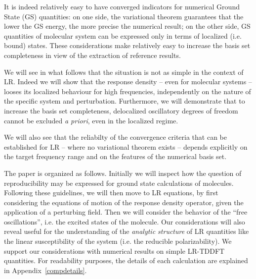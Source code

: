 \documentclass[reprint,aps,prb]{revtex4-1}
\begin{document}
It is indeed relatively easy to have converged indicators for numerical Ground State (GS) quantities: on one side, the variational theorem
guarantees that the lower the GS energy, the more precise the numerical result; on the other side, GS quantities of molecular system  can be expressed
only in terms of localized (i.e. bound) states. These considerations make relatively easy to increase the basis set completeness in view of the extraction of reference results.

We will see in what follows that the situation is not as simple in the context of LR. Indeed we will show that the response density -- even for molecular systems -- looses its localized behaviour for high frequencies, independently on the nature of the specific system and perturbation. Furthermore, we will demonstrate that to increase the basis set completeness, delocalized oscillatory degrees of freedom cannot be excluded \textit{a priori}, even in the localized regime.

We will also see that the reliabilty of the convergence criteria that can be established for LR -- where no variational theorem exists -- depends explicitly on the target frequency range and on the features of the numerical basis set.


The paper is organized as follows.
Initially we will inspect how the question of reproducibility may be expressed
for ground state calculations of molecules.
Following these guidelines, we will then move to LR equations,
by first considering the equations of motion of the response density operator, given
the application of a perturbing field.
Then we will consider the behavior of the ``free oscillations'', i.e. the excited states
of the molecule.
Our considerations will also reveal useful for the understanding of the \emph{analytic structure} of LR quantities like
the linear susceptibility of the system (i.e. the reducible polarizability).
We support our considerations with numerical results on simple LR-TDDFT quantities.
For readability purposes, the details of each calculation are explained in Appendix~\ref{compdetails}.
\end{document}
